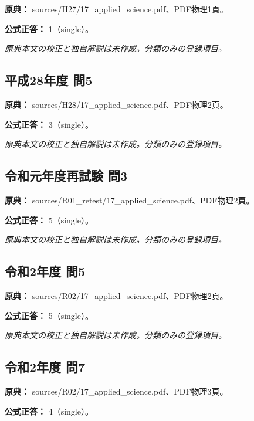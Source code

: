 \noindent\textbf{原典：} sources/H27/17\_applied\_science.pdf、PDF物理1頁。

\textbf{公式正答：} 1（single）。

\par\textit{原典本文の校正と独自解説は未作成。分類のみの登録項目。}

\subsection{平成28年度 問5}
\label{q:h28-reg-applied-05}

\noindent\textbf{原典：} sources/H28/17\_applied\_science.pdf、PDF物理2頁。

\textbf{公式正答：} 3（single）。

\par\textit{原典本文の校正と独自解説は未作成。分類のみの登録項目。}

\subsection{令和元年度再試験 問3}
\label{q:r01-ret-applied-03}

\noindent\textbf{原典：} sources/R01\_retest/17\_applied\_science.pdf、PDF物理2頁。

\textbf{公式正答：} 5（single）。

\par\textit{原典本文の校正と独自解説は未作成。分類のみの登録項目。}

\subsection{令和2年度 問5}
\label{q:r02-reg-applied-05}

\noindent\textbf{原典：} sources/R02/17\_applied\_science.pdf、PDF物理2頁。

\textbf{公式正答：} 5（single）。

\par\textit{原典本文の校正と独自解説は未作成。分類のみの登録項目。}

\subsection{令和2年度 問7}
\label{q:r02-reg-applied-07}

\noindent\textbf{原典：} sources/R02/17\_applied\_science.pdf、PDF物理3頁。

\textbf{公式正答：} 4（single）。

